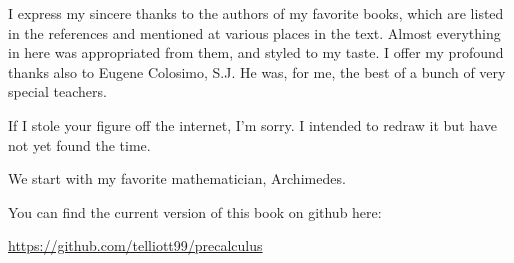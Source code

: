 \documentclass[11pt, oneside]{article}
\begin{document}
I express my sincere thanks to the authors of my favorite books, which are listed in the references and mentioned at various places in the text.  Almost everything in here was appropriated from them, and styled to my taste.  I offer my profound thanks also to Eugene Colosimo, S.J.  He was, for me, the best of a bunch of very special teachers.

If I stole your figure off the internet, I'm sorry.  I intended to redraw it but have not yet found the time.  

We start with my favorite mathematician, Archimedes.

You can find the current version of this book on github here:

\url{https://github.com/telliott99/precalculus}
\end{document}
